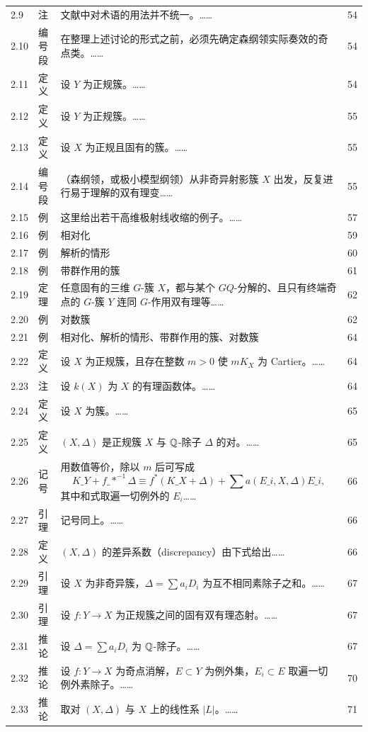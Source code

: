 \begin{longtable}{@{}p{}p{}p{}p{}@{}}
2.9 & 注 & 文献中对术语的用法并不统一。…… & 54 \\
2.10 & 编号段 & 在整理上述讨论的形式之前，必须先确定森纲领实际奏效的奇点类。…… & 54 \\
2.11 & 定义 & 设 $Y$ 为正规簇。…… & 54 \\
2.12 & 定义 & 设 $Y$ 为正规簇。…… & 55 \\
2.13 & 定义 & 设 $X$ 为正规且固有的簇。…… & 55 \\
2.14 & 编号段 & （森纲领，或极小模型纲领）\quad 从非奇异射影簇 $X$ 出发，反复进行易于理解的双有理变…… & 55 \\
2.15 & 例 & 这里给出若干高维极射线收缩的例子。…… & 57 \\
2.16 & 例 & 相对化 & 59 \\
2.17 & 例 & 解析的情形 & 60 \\
2.18 & 例 & 带群作用的簇 & 61 \\
2.19 & 定理 & 任意固有的三维 $G$-簇 $X$，都与某个 $GQ$-分解的、且只有终端奇点的 $G$-簇 $Y$ 连同 $G$-作用双有理等…… & 62 \\
2.20 & 例 & 对数簇 & 62 \\
2.21 & 例 & 相对化、解析的情形、带群作用的簇、对数簇 & 64 \\
2.22 & 定义 & 设 $X$ 为正规簇，且存在整数 $m>0$ 使 $mK_X$ 为 Cartier。…… & 64 \\
2.23 & 注 & 设 $k(X)$ 为 $X$ 的有理函数体。…… & 64 \\
2.24 & 定义 & 设 $X$ 为簇。…… & 65 \\
2.25 & 定义 & $(X,\Delta)$ 是正规簇 $X$ 与 $\mathbb{Q}$-除子 $\Delta$ 的对。…… & 65 \\
2.26 & 记号 & 用数值等价，除以 $m$ 后可写成 \[ K\_Y+f\_*^{-1}\Delta\equiv f^*(K\_X+\Delta)+\sum a(E\_i,X,\Delta)E\_i, \] 其中和式取遍一切例外的 $E_i$…… & 66 \\
2.27 & 引理 & 记号同上。…… & 66 \\
2.28 & 定义 & $(X,\Delta)$ 的差异系数（discrepancy）由下式给出…… & 66 \\
2.29 & 引理 & 设 $X$ 为非奇异簇，$\Delta=\sum a_iD_i$ 为互不相同素除子之和。…… & 67 \\
2.30 & 引理 & 设 $f\colon Y\to X$ 为正规簇之间的固有双有理态射。…… & 67 \\
2.31 & 推论 & 设 $\Delta=\sum a_iD_i$ 为 $\mathbb{Q}$-除子。…… & 67 \\
2.32 & 推论 & 设 $f\colon Y\to X$ 为奇点消解，$E\subset Y$ 为例外集，$E_i\subset E$ 取遍一切例外素除子。…… & 70 \\
2.33 & 推论 & 取对 $(X,\Delta)$ 与 $X$ 上的线性系 $|L|$。…… & 71 \\

\end{longtable}
